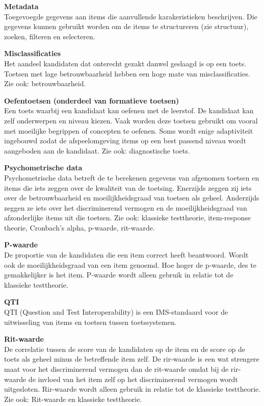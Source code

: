 \documentclass[
]{book}
\begin{document}
\textbf{Metadata}\\
Toegevoegde gegevens aan items die aanvullende karakeristieken beschrijven. Die gegevens kunnen gebruikt worden om de items te structureren (zie structuur), zoeken, filteren en selecteren.

\textbf{Misclassificaties}\\
Het aandeel kandidaten dat onterecht gezakt danwel geslaagd is op een toets. Toetsen met lage betrouwbaarheid hebben een hoge mate van misclassificaties. Zie ook: betrouwbaarheid.

\textbf{Oefentoetsen (onderdeel van formatieve toetsen)}\\
Een toets waarbij een kandidaat kan oefenen met de leerstof. De kandidaat kan zelf onderwerpen en niveau kiezen. Vaak worden deze toetsen gebruikt om vooral met moeilijke begrippen of concepten te oefenen. Soms wordt enige adaptiviteit ingebouwd zodat de afspeelomgeving items op een best passend niveau wordt aangeboden aan de kandidaat. Zie ook: diagnostische toets.

\textbf{Psychometrische data}\\
Psychometrische data betreft de te berekenen gegevens van afgenomen toetsen en items die iets zeggen over de kwaliteit van de toetsing. Enerzijds zeggen zij iets over de betrouwbaarheid en moeilijkheidsgraad van toetsen als geheel. Anderzijds zeggen ze iets over het discriminerend vermogen en de moeilijkheidsgraad van afzonderlijke items uit die toetsen. Zie ook: klassieke testtheorie, item-response theorie, Cronbach's alpha, p-waarde, rit-waarde.

\textbf{P-waarde}\\
De proportie van de kandidaten die een item correct heeft beantwoord. Wordt ook de moeilijkheidsgraad van een item genoemd. Hoe hoger de p-waarde, des te gemakkelijker is het item. P-waarde wordt alleen gebruik in relatie tot de klassieke testtheorie.

\textbf{QTI}\\
QTI (Question and Test Interoperability) is een IMS-standaard voor de uitwisseling van items en toetsen tussen toetssystemen.

\textbf{Rit-waarde}\\
De correlatie tussen de score van de kandidaten op de item en de score op de toets als geheel minus de betreffende item zelf. De rir-waarde is een wat strengere maat voor het discriminerend vermogen dan de rit-waarde omdat bij de rir-waarde de invloed van het item zelf op het discriminerend vermogen wordt uitgesloten. Rir-waarde wordt alleen gebruik in relatie tot de klassieke testtheorie. Zie ook: Rit-waarde en klassieke testtheorie.
\end{document}
